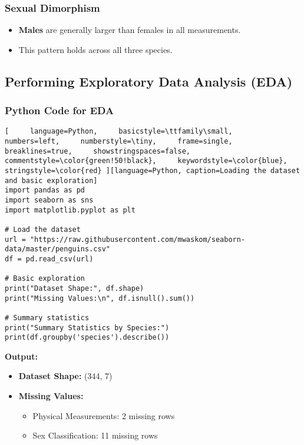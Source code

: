 \documentclass[12pt]{article}
\begin{document}
\begin{itemize}
\subsubsection*{Sexual Dimorphism}
\begin{itemize}
    \item \textbf{Males} are generally larger than females in all measurements.
    \item This pattern holds across all three species.
\end{itemize}

\subsection*{Performing Exploratory Data Analysis (EDA)}

\subsubsection*{Python Code for EDA}

\begin{lstlisting}[     language=Python,     basicstyle=\ttfamily\small,     numbers=left,     numberstyle=\tiny,     frame=single,     breaklines=true,     showstringspaces=false,     commentstyle=\color{green!50!black},     keywordstyle=\color{blue},     stringstyle=\color{red} ][language=Python, caption=Loading the dataset and basic exploration]
import pandas as pd
import seaborn as sns
import matplotlib.pyplot as plt

# Load the dataset
url = "https://raw.githubusercontent.com/mwaskom/seaborn-data/master/penguins.csv"
df = pd.read_csv(url)

# Basic exploration
print("Dataset Shape:", df.shape)
print("Missing Values:\n", df.isnull().sum())

# Summary statistics
print("Summary Statistics by Species:")
print(df.groupby('species').describe())
\end{lstlisting}

\textbf{Output:}
\begin{itemize}
    \item \textbf{Dataset Shape:} (344, 7)
    \item \textbf{Missing Values:}
    \begin{itemize}
        \item Physical Measurements: 2 missing rows
        \item Sex Classification: 11 missing rows
    \end{itemize}
\end{itemize}


\end{itemize}
\end{document}
